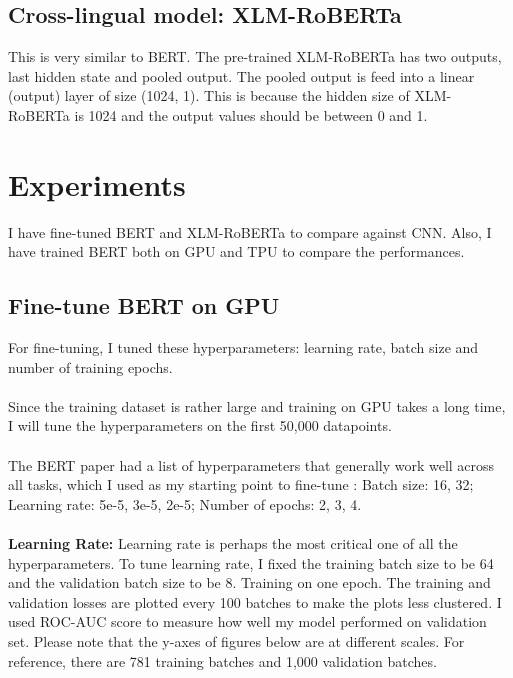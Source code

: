 \documentclass[11pt,a4paper]{article}
\begin{document}
\subsection{Cross-lingual model: XLM-RoBERTa}

This is very similar to BERT. The pre-trained XLM-RoBERTa has two outputs, last hidden state and pooled output. The pooled output is feed into a linear (output) layer of size (1024, 1). This is because the hidden size of XLM-RoBERTa is 1024 and the output values should be between 0 and 1.

\section{Experiments}

I have fine-tuned BERT and XLM-RoBERTa to compare against CNN. Also, I have trained BERT both on GPU and TPU to compare the performances.

\subsection{Fine-tune BERT on GPU}

For fine-tuning, I tuned these hyperparameters: learning rate, batch size and number of training epochs.\\
\\
Since the training dataset is rather large and training on GPU takes a long time, I will tune the hyperparameters on the first 50,000 datapoints.\\
\\
The BERT paper had a list of hyperparameters that generally work well across all tasks, which I used as my starting point to fine-tune \cite{BERT}: 
Batch size: 16, 32; Learning rate: 5e-5, 3e-5, 2e-5; Number of epochs: 2, 3, 4.\\
\\
\textbf {Learning Rate:} Learning rate is perhaps the most critical one of all the hyperparameters. To tune learning rate, I fixed the training batch size to be 64 and the validation batch size to be 8. Training on one epoch. The training and validation losses are plotted every 100 batches to make the plots less clustered. I used ROC-AUC score to measure how well my model performed on validation set. Please note that the y-axes of figures below are at different scales. For reference, there are 781 training batches and 1,000 validation batches.\\
\end{document}
